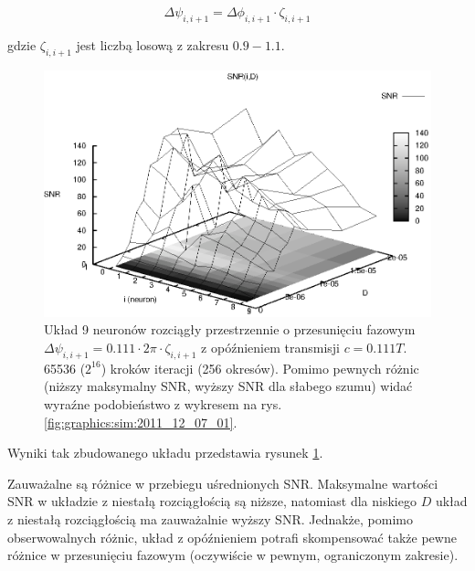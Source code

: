   \begin{equation}
    \Delta \psi_{i,i+1} = \Delta \phi_{i,i+1} \cdot \zeta_{i,i+1}
  \end{equation}

  gdzie $\zeta_{i,i+1}$ jest liczbą losową z zakresu $0.9 - 1.1$.

  \begin{figure}
    \includegraphics[width=140mm]{images/9neuron/2011_12_05_01}
    \caption{Układ 9 neuronów rozciągły przestrzennie o przesunięciu fazowym $\Delta \psi_{i,i+1} = 0.111 \cdot 2 \pi \cdot \zeta_{i,i+1}$ z opóźnieniem transmisji $c = 0.111 T$. 65536 ($2^{16}$) kroków iteracji (256 okresów). Pomimo pewnych różnic (niższy maksymalny SNR, wyższy SNR dla słabego szumu) widać wyraźne podobieństwo z wykresem na rys. \ref{fig:graphics:sim:2011_12_07_01}.}
    \label{fig:graphics:sim:2010_12_05_01}
  \end{figure}

  Wyniki tak zbudowanego układu przedstawia rysunek \ref{fig:graphics:sim:2010_12_05_01}.

  Zauważalne są różnice w przebiegu uśrednionych SNR. Maksymalne wartości SNR w układzie z niestałą rozciągłością są niższe, natomiast dla niskiego $D$ układ z niestałą rozciągłością ma zauważalnie wyższy SNR. Jednakże, pomimo obserwowalnych różnic, układ z opóźnieniem potrafi skompensować także pewne różnice w przesunięciu fazowym (oczywiście w pewnym, ograniczonym zakresie).

